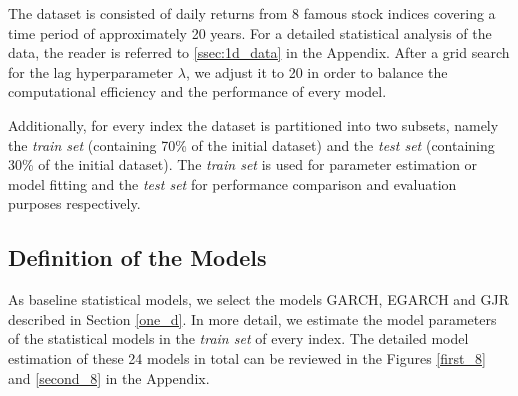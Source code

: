 \documentclass[a4paper, oneside]{discothesis}
\begin{document}
The dataset is consisted of daily returns from 8 famous stock indices covering a time period of approximately 20 years. For a detailed statistical analysis of the data, the reader is referred to \ref{ssec:1d_data} in the Appendix. After a grid search for the lag hyperparameter $\lambda$, we adjust it to 20 in order to balance the computational efficiency and the performance of every model. 

Additionally, for every index the dataset is partitioned into two subsets, namely the \textit{train set} (containing 70\% of the initial dataset) and the \textit{test set} (containing 30\% of the initial dataset). The \textit{train set} is used for parameter estimation or model fitting and the \textit{test set} for performance comparison and evaluation purposes respectively. 

\subsection{Definition of the Models}
As baseline statistical models, we select the models GARCH, EGARCH and GJR described in Section \ref{one_d}. In more detail, we estimate the model parameters of the statistical models in the \textit{train set} of every index. The detailed model estimation of these 24 models in total can be reviewed in the Figures \ref{first_8} and \ref{second_8} in the Appendix. 
\end{document}
